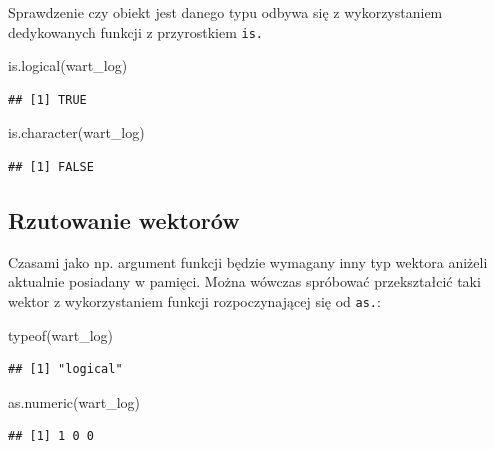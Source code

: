 \documentclass[
]{book}
\newenvironment{Shaded}{\begin{snugshade}}{\end{snugshade}}
\newcommand{\FunctionTok}[1]{\textcolor[rgb]{0.00,0.00,0.00}{#1}}
\newcommand{\NormalTok}[1]{#1}
\begin{document}
Sprawdzenie czy obiekt jest danego typu odbywa się z wykorzystaniem dedykowanych funkcji z przyrostkiem \texttt{is.}

\begin{Shaded}
\begin{Highlighting}[]
\FunctionTok{is.logical}\NormalTok{(wart\_log)}
\end{Highlighting}
\end{Shaded}

\begin{verbatim}
## [1] TRUE
\end{verbatim}

\begin{Shaded}
\begin{Highlighting}[]
\FunctionTok{is.character}\NormalTok{(wart\_log)}
\end{Highlighting}
\end{Shaded}

\begin{verbatim}
## [1] FALSE
\end{verbatim}

\hypertarget{rzutowanie-wektoruxf3w}{%
\subsection{Rzutowanie wektorów}\label{rzutowanie-wektoruxf3w}}

Czasami jako np. argument funkcji będzie wymagany inny typ wektora aniżeli aktualnie posiadany w pamięci. Można wówczas spróbować przekształcić taki wektor z wykorzystaniem funkcji rozpoczynającej się od \texttt{as.}:

\begin{Shaded}
\begin{Highlighting}[]
\FunctionTok{typeof}\NormalTok{(wart\_log)}
\end{Highlighting}
\end{Shaded}

\begin{verbatim}
## [1] "logical"
\end{verbatim}

\begin{Shaded}
\begin{Highlighting}[]
\FunctionTok{as.numeric}\NormalTok{(wart\_log)}
\end{Highlighting}
\end{Shaded}

\begin{verbatim}
## [1] 1 0 0
\end{verbatim}
\end{document}
